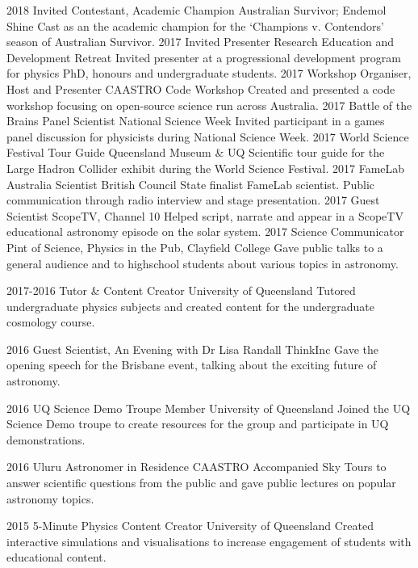 \documentclass[]{friggeri-cv} %
\begin{document}
\begin{entrylist}
\entry
    {2018}
    {Invited Contestant, Academic Champion}
    {Australian Survivor; Endemol Shine}
    {Cast as an the academic champion for the `Champions v. Contendors' season of Australian Survivor.}
\entry
    {2017}
    {Invited Presenter}
    {Research Education and Development Retreat}
    {Invited presenter at a progressional development program for physics PhD, honours and undergraduate students.}
\entry
    {2017}
    {Workshop Organiser, Host and Presenter}
    {CAASTRO Code Workshop}
    {Created and presented a code workshop focusing on open-source science run across Australia.}
\entry
    {2017}
    {Battle of the Brains Panel Scientist}
    {National Science Week}
    {Invited participant in a games panel discussion for physicists during National Science Week.}
\entry
    {2017}
    {World Science Festival Tour Guide}
    {Queensland Museum \& UQ}
    {Scientific tour guide for the Large Hadron Collider exhibit during the World Science Festival.}
\entry
    {2017}
    {FameLab Australia Scientist}
    {British Council}
    {State finalist FameLab scientist. Public communication through radio interview and stage presentation.}
\entry
    {2017}
    {Guest Scientist}
    {ScopeTV, Channel 10}
    {Helped script, narrate and appear in a ScopeTV educational astronomy episode on the solar system.}
\entry
    {2017}
    {Science Communicator}
    {Pint of Science, Physics in the Pub, Clayfield College}
    {Gave public talks to a general audience and to highschool students about various topics in astronomy.}
\end{entrylist}
\begin{entrylist}
\entry
    {2017-2016}
    {Tutor \& Content Creator}
    {University of Queensland}
    {Tutored undergraduate physics subjects and created content for the undergraduate cosmology course.}
\end{entrylist}
\begin{entrylist}
\entry
    {2016}
    {Guest Scientist, An Evening with Dr Lisa Randall}
    {ThinkInc}
    {Gave the opening speech for the Brisbane event, talking about the exciting future of astronomy.}
\end{entrylist}
\begin{entrylist}
\entry
    {2016}
    {UQ Science Demo Troupe Member}
    {University of Queensland}
    {Joined the UQ Science Demo troupe to create resources for the group and participate in UQ demonstrations.}
\end{entrylist}
\begin{entrylist}
\entry
    {2016}
    {Uluru Astronomer in Residence}
    {CAASTRO}
    {Accompanied Sky Tours to answer scientific questions from the public and gave public lectures on popular astronomy topics.}
\end{entrylist}
\begin{entrylist}
\entry
    {2015}
    {5-Minute Physics Content Creator}
    {University of Queensland}
    {Created interactive simulations and visualisations to increase engagement of students with educational content.}
\end{entrylist}
\end{document}
